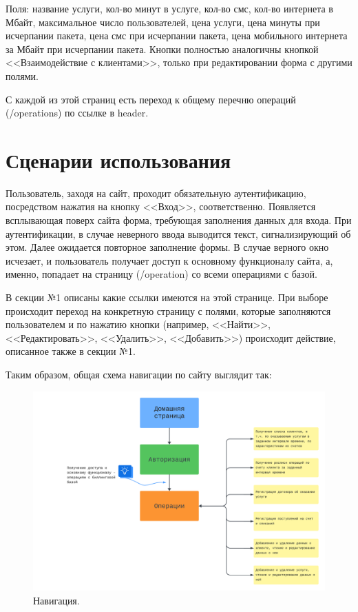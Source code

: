 \documentclass[oneside,senior,etd]{BYUPhysForDegree}
\begin{document}
\begin{enumerate}
    Поля: название услуги, кол-во минут в услуге, кол-во смс, кол-во интернета в Мбайт, максимальное число пользователей, цена услуги, цена минуты при исчерпании пакета, цена смс при исчерпании пакета, цена мобильного интернета за Мбайт при исчерпании пакета. Кнопки полностью аналогичны кнопкой <<Взаимодействие с клиентами>>, только при редактировании форма с другими полями.
\end{enumerate}

С каждой из этой страниц есть переход к общему перечню операций (/operations) по ссылке в header.

\newpage
\section{Сценарии использования}

Пользователь, заходя на сайт, проходит обязательную аутентификацию, посредством нажатия на кнопку <<Вход>>, соответственно. Появляется всплывающая поверх сайта форма, требующая заполнения данных для входа. При аутентификации, в случае неверного ввода выводится текст, сигнализирующий об этом. Далее ожидается повторное заполнение формы. В случае верного окно исчезает, и пользователь получает доступ к основному функционалу сайта, а, именно, попадает на страницу (/operation) со всеми операциями с базой.

В секции №1 описаны какие ссылки имеются на этой странице. При выборе происходит переход на конкретную страницу с полями, которые заполняются пользователем и по нажатию кнопки (например, <<Найти>>, <<Редактировать>>, <<Удалить>>, <<Добавить>>) происходит действие, описанное также в секции №1.

Таким образом, общая схема навигации по сайту выглядит так:

\begin{figure}[hbt!]
    \centering
    \includegraphics[width=1.0\linewidth]{sitemap.png}
    \caption{Навигация.}
    \label{fig:sitemap}
\end{figure}
\end{document}
